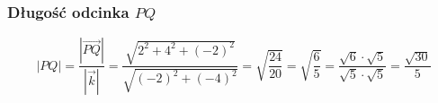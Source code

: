\documentclass[11pt]{article}
\begin{document}
\subsubsection{Długość odcinka \(PQ\)}
\label{sec:org77c38fd}
\[|PQ| = \frac{ |\overrightarrow{PQ}| }{ | \vec k | } =
  \frac{ \sqrt{2^{2} + 4^{2} + {(-2)}^{2}}}
  { \sqrt{ {(-2)}^{2} + {(-4)}^{2} } }
  = \sqrt{ \frac{24}{20} }
  = \sqrt{ \frac{6}{5} }
  = \frac{\sqrt{6} \cdot \sqrt{5} }{\sqrt{5} \cdot \sqrt{5}}
  = \frac{\sqrt{30}}{5}
\]
\end{document}
